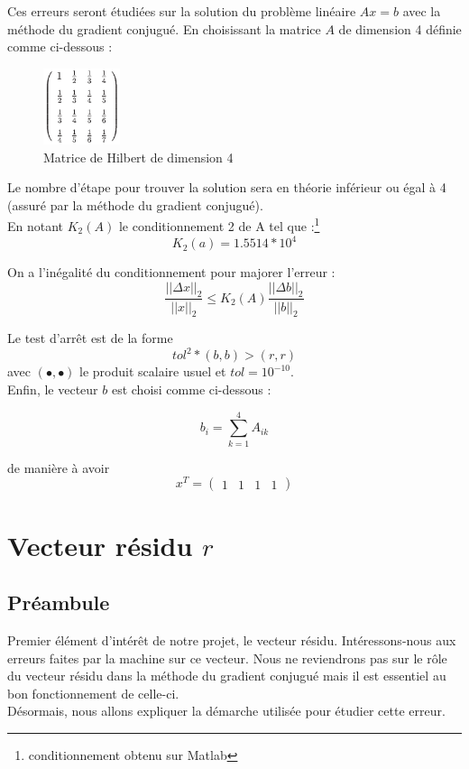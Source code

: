 \documentclass[12,french]{report}
\begin{document}
 Ces erreurs seront étudiées sur la solution du problème linéaire $Ax=b$ avec la méthode du gradient conjugué. En choisissant la matrice $A$ de dimension 4 définie comme ci-dessous :\\

\begin{figure}[H]
	\center
	\includegraphics[width=0.2\textwidth]{./Images/H_4}
	\caption{Matrice de Hilbert de dimension 4}
\end{figure}

Le nombre d'étape pour trouver la solution sera en théorie inférieur ou égal à 4 (assuré par la méthode du gradient conjugué).\\

En notant $K_2(A)$ le conditionnement 2 de A tel que :\footnote{conditionnement obtenu sur Matlab}
$$K_2(a)= 1.5514*10^4$$

On a l'inégalité du conditionnement pour majorer l'erreur :
$$\frac{||\Delta x||_{2}}{||x||_2}\leq K_2(A)\frac{||\Delta b||_{2}}{||b||_2}$$

Le test d'arrêt est de la forme $$tol^2*(b,b) > (r,r) $$
avec $(\bullet,\bullet)$ le produit scalaire usuel et $tol=10^{-10}$.\\

Enfin, le vecteur $b$ est choisi comme ci-dessous :

$$b_i=\sum_{k=1}^4A_{ik}$$

de manière à avoir 
$$x^T=\left(\begin{array}{cccc}
1 & 1 & 1 & 1\end{array}\right)$$




\chapter{Vecteur résidu $r$} %

\section{Préambule}

Premier élément d'intérêt de notre projet, le vecteur résidu. Intéressons-nous aux erreurs faites par la machine sur ce vecteur. Nous ne reviendrons pas sur le rôle du vecteur résidu dans la méthode du gradient conjugué mais il est essentiel au bon fonctionnement de celle-ci.\\
Désormais, nous allons expliquer la démarche utilisée pour étudier cette erreur.
\end{document}
